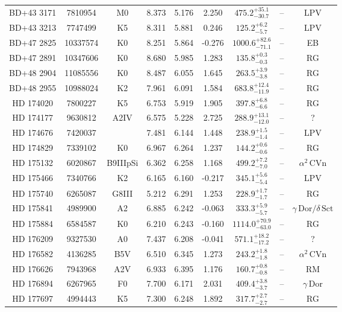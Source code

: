 \begin{table*}
\begin{tabular}{ccccccccc}
BD+43 3171 & 7810954 & M0 & 8.373 & 5.176 & 2.250 & $475.2^{+35.1}_{-30.7}$ & -- & LPV \\
BD+43 3213 & 7747499 & K5 & 8.311 & 5.881 & 0.246 & $125.2^{+6.2}_{-5.7}$ & -- & LPV \\
BD+47 2825 & 10337574 & K0 & 8.251 & 5.864 & -0.276 & $1000.6^{+82.6}_{-71.1}$ & -- & EB \\
BD+47 2891 & 10347606 & K0 & 8.680 & 5.985 & 1.283 & $135.8^{+0.3}_{-0.3}$ & -- & RG \\
BD+48 2904 & 11085556 & K0 & 8.487 & 6.055 & 1.645 & $263.5^{+3.9}_{-3.8}$ & -- & RG \\
BD+48 2955 & 10988024 & K2 & 7.961 & 6.091 & 1.584 & $683.8^{+12.4}_{-11.9}$ & -- & RG \\
HD 174020 & 7800227 & K5 & 6.753 & 5.919 & 1.905 & $397.8^{+6.8}_{-6.6}$ & -- & RG \\
HD 174177 & 9630812 & A2IV & 6.575 & 5.228 & 2.725 & $288.9^{+13.1}_{-12.0}$ & -- & ? \\
HD 174676 & 7420037 &  & 7.481 & 6.144 & 1.448 & $238.9^{+1.5}_{-1.4}$ & -- & LPV \\
HD 174829 & 7339102 & K0 & 6.967 & 6.264 & 1.237 & $144.2^{+0.6}_{-0.6}$ & -- & RG \\
HD 175132 & 6020867 & B9IIIpSi & 6.362 & 6.258 & 1.168 & $499.2^{+7.2}_{-7.0}$ & -- & $\alpha^2\,\text{CVn}$ \\
HD 175466 & 7340766 & K2 & 6.165 & 6.160 & -0.217 & $345.1^{+5.6}_{-5.4}$ & -- & LPV \\
HD 175740 & 6265087 & G8III & 5.212 & 6.291 & 1.253 & $228.9^{+1.7}_{-1.7}$ & -- & RG \\
HD 175841 & 4989900 & A2 & 6.885 & 6.242 & -0.063 & $333.3^{+5.9}_{-5.7}$ & -- & $\gamma\,\text{Dor} /\delta\,\text{Sct}$ \\
HD 175884 & 6584587 & K0 & 6.210 & 6.243 & -0.160 & $1114.0^{+70.9}_{-63.0}$ & -- & RG \\
HD 176209 & 9327530 & A0 & 7.437 & 6.208 & -0.041 & $571.1^{+18.2}_{-17.2}$ & -- & ? \\
HD 176582 & 4136285 & B5V & 6.510 & 6.345 & 1.273 & $243.2^{+1.8}_{-1.8}$ & -- & $\alpha^2\,\text{CVn}$ \\
HD 176626 & 7943968 & A2V & 6.933 & 6.395 & 1.176 & $160.7^{+0.8}_{-0.8}$ & -- & RM \\
HD 176894 & 6267965 & F0 & 7.700 & 6.171 & 2.031 & $409.4^{+3.8}_{-3.7}$ & -- & $\gamma\,\text{Dor}$ \\
HD 177697 & 4994443 & K5 & 7.300 & 6.248 & 1.892 & $317.7^{+2.7}_{-2.7}$ & -- & RG \\

\end{tabular}
\end{table*}

